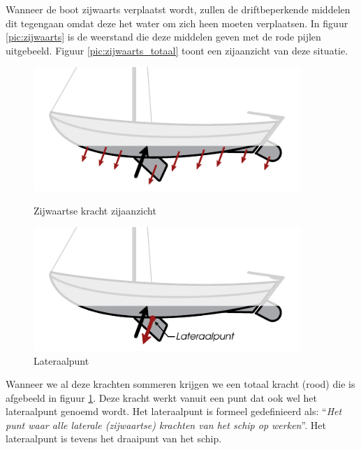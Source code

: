 Wanneer de boot zijwaarts verplaatst wordt, zullen de driftbeperkende middelen dit tegengaan omdat deze het water om zich heen moeten verplaatsen. In figuur \ref{pic:zijwaarts} is de weerstand die deze middelen geven met de rode pijlen uitgebeeld. Figuur \ref{pic:zijwaarts_totaal} toont een zijaanzicht van deze situatie.

\begin{figure}[H]
	\centering
	\begin{minipage}[b]{0.48\textwidth}
		\centering
		\includegraphics[width=0.90\textwidth]{Hoofdstukken/Krachten/pdf/lateraal_zij.pdf}
		\caption{Zijwaartse kracht zijaanzicht}
		\label{pic:zijwaarts_totaal}
	\end{minipage}
	\hfill
	\begin{minipage}[b]{0.48\textwidth}
		\centering
		\includegraphics[width=0.90\textwidth]{Hoofdstukken/Krachten/pdf/lateraal_punt.pdf}
		\caption{Lateraalpunt}
		\label{pic:lateraal}
	\end{minipage}
\end{figure}

Wanneer we al deze krachten sommeren krijgen we een totaal kracht (rood) die is afgebeeld in figuur \ref{pic:lateraal}. Deze kracht werkt vanuit een punt dat ook wel het lateraalpunt genoemd wordt. Het lateraalpunt is formeel gedefinieerd als: ``\textit{Het punt waar alle laterale (zijwaartse) krachten van het schip op werken}''. Het lateraalpunt is tevens het draaipunt van het schip.

